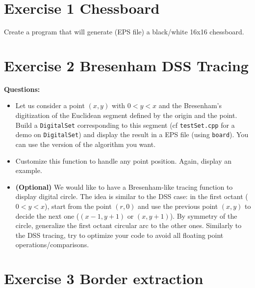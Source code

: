 \documentclass[a4paper, 11pt]{article}
\begin{document}
\section*{Exercise 1 \rm Chessboard}

\par Create a program that will generate (EPS file) a black/white 16x16 chessboard.


\section*{Exercise 2 \rm Bresenham DSS Tracing}

\noindent \textbf{Questions:}
\begin{itemize}
	\item Let us consider a point $(x,y)$ with $0<y<x$ and the Bresenham's digitization of the Euclidean segment defined by the origin and the point. Build a \texttt{DigitalSet} corresponding to this segment (cf \texttt{testSet.cpp} for a demo on \texttt{DigitalSet}) and display the result in a EPS file (using \texttt{board}). You can use the version of the algorithm you want.
	
	\item Customize this function to handle any point position. Again, display an example.
	
	\item \textbf{(Optional)} We would like to have a Bresenham-like tracing function to display digital circle. The idea is similar to the DSS case: in the first octant ($0 < y < x$), start from the point $(r,0)$ and use the previous point $(x,y)$ to decide the next one ($(x-1,y+1)$ or $(x,y+1)$). By symmetry of the circle, generalize the first octant circular arc to the other ones. Similarly to the DSS tracing, try to optimize your code to avoid all floating point operations/comparisons.
\end{itemize}



\section*{Exercise 3 \rm Border extraction}
\end{document}
